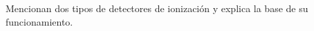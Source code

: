 \documentclass[./../main.tex]{subfiles}
\begin{document}
    \begin{exercise}
        Mencionan dos tipos de detectores de ionización y explica la base de su funcionamiento.
    \end{exercise}
\end{document}
